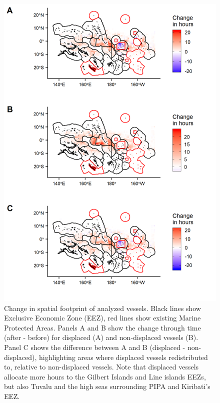 \documentclass[12pt]{article}
\begin{document}
\begin{figure}
\centering
\includegraphics{img/fishing_raster_diff.png}
\caption{\label{fig:fishing_raster_diff}Change in spatial footprint of analyzed vessels. Black lines show Exclusive Economic Zone (EEZ), red lines show existing Marine Protected Areas. Panels A and B show the change through time (after - before) for displaced (A) and non-displaced vessels (B). Panel C shows the difference between A and B (displaced - non-displaced), highlighting areas where displaced vessels redistributed to, relative to non-displaced vessels. Note that displaced vessels allocate more hours to the Gilbert Islands and Line islands EEZs, but also Tuvalu and the high seas surrounding PIPA and Kiribati's EEZ.}
\end{figure}

\begin{landscape}

\end{landscape}
\end{document}
